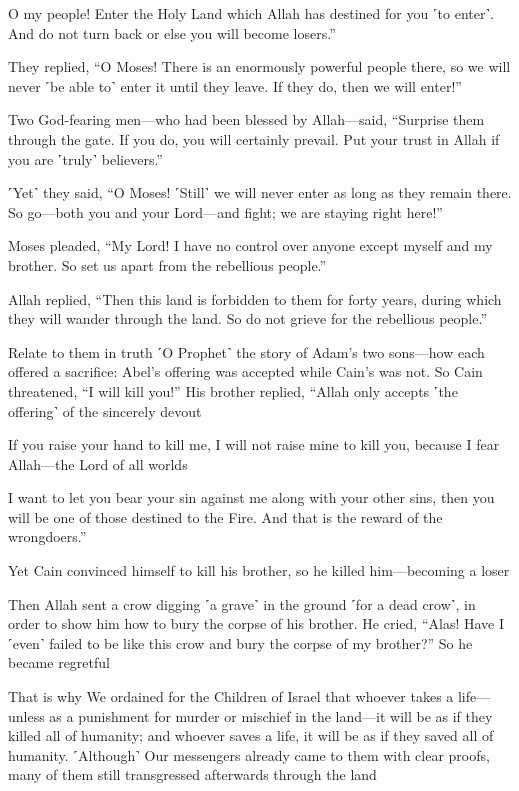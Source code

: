 O my people! Enter the Holy Land which Allah has destined for you ˹to enter˺. And do not turn back or else you will become losers.”

They replied, “O Moses! There is an enormously powerful people there, so we will never ˹be able to˺ enter it until they leave. If they do, then we will enter!”

Two God-fearing men—who had been blessed by Allah—said, “Surprise them through the gate. If you do, you will certainly prevail. Put your trust in Allah if you are ˹truly˺ believers.”

˹Yet˺ they said, “O Moses! ˹Still˺ we will never enter as long as they remain there. So go—both you and your Lord—and fight; we are staying right here!”

Moses pleaded, “My Lord! I have no control over anyone except myself and my brother. So set us apart from the rebellious people.”

Allah replied, “Then this land is forbidden to them for forty years, during which they will wander through the land. So do not grieve for the rebellious people.”

Relate to them in truth ˹O Prophet˺ the story of Adam’s two sons—how each offered a sacrifice: Abel’s offering was accepted while Cain’s was not. So Cain threatened, “I will kill you!” His brother replied, “Allah only accepts ˹the offering˺ of the sincerely devout

If you raise your hand to kill me, I will not raise mine to kill you, because I fear Allah—the Lord of all worlds

I want to let you bear your sin against me along with your other sins, then you will be one of those destined to the Fire. And that is the reward of the wrongdoers.”

Yet Cain convinced himself to kill his brother, so he killed him—becoming a loser

Then Allah sent a crow digging ˹a grave˺ in the ground ˹for a dead crow˺, in order to show him how to bury the corpse of his brother. He cried, “Alas! Have I ˹even˺ failed to be like this crow and bury the corpse of my brother?” So he became regretful

That is why We ordained for the Children of Israel that whoever takes a life—unless as a punishment for murder or mischief in the land—it will be as if they killed all of humanity; and whoever saves a life, it will be as if they saved all of humanity. ˹Although˺ Our messengers already came to them with clear proofs, many of them still transgressed afterwards through the land

